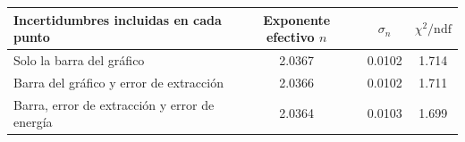 \begin{tabular}{lccc}
\toprule
Incertidumbres incluidas en cada punto & Exponente efectivo $n$ & $\sigma_n$ & $\chi^2/\mathrm{ndf}$ \\
\midrule
Solo la barra del gráfico & 2.0367 & 0.0102 & 1.714 \\
Barra del gráfico y error de extracción & 2.0366 & 0.0102 & 1.711 \\
Barra, error de extracción y error de energía & 2.0364 & 0.0103 & 1.699 \\
\bottomrule
\end{tabular}
